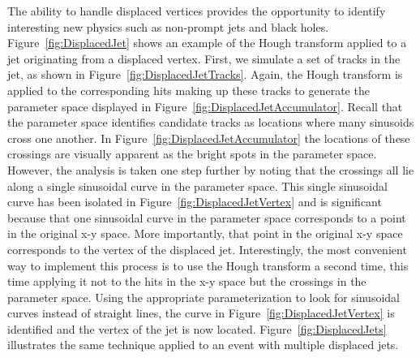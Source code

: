 \documentclass{JINST}
\begin{document}
The ability to handle displaced vertices provides the opportunity to identify interesting new physics such as non-prompt
jets and black holes. Figure~\ref{fig:DisplacedJet} shows an example of the Hough transform applied to a jet originating
from a displaced vertex. First, we simulate a set of tracks in the jet, as shown in
Figure~\ref{fig:DisplacedJetTracks}. Again, the Hough transform is applied to the corresponding hits making up these
tracks to generate the parameter space displayed in Figure~\ref{fig:DisplacedJetAccumulator}. Recall that the parameter
space identifies candidate tracks as locations where many sinusoids cross one another. In
Figure~\ref{fig:DisplacedJetAccumulator} the locations of these crossings are visually apparent as the bright spots in
the parameter space.  However, the analysis is taken one step further by noting that the crossings all lie along a
single sinusoidal curve in the parameter space.  This single sinusoidal curve has been isolated in
Figure~\ref{fig:DisplacedJetVertex} and is significant because that one sinusoidal curve in the parameter space
corresponds to a point in the original x-y space.  More importantly, that point in the original x-y space corresponds to
the vertex of the displaced jet.  Interestingly, the most convenient way to implement this process is to use the Hough
transform a second time, this time applying it not to the hits in the x-y space but the crossings in the parameter
space.  Using the appropriate parameterization to look for sinusoidal curves instead of straight lines, the curve in
Figure~\ref{fig:DisplacedJetVertex} is identified and the vertex of the jet is now located.
Figure~\ref{fig:DisplacedJets} illustrates the same technique applied to an event with multiple displaced jets.
\end{document}
